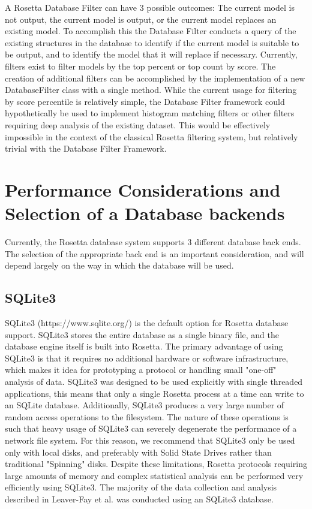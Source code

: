 A Rosetta Database Filter can have 3 possible outcomes:  The current model is not output, the current model is output, or the current model replaces an existing model.
To accomplish this the Database Filter conducts a query of the existing structures in the database  to identify if the current model is suitable to be output, and to identify the model that it will replace if necessary. 
Currently, filters exist to filter models by the top percent or top count by score.
The creation of additional filters can be accomplished by the implementation of a new DatabaseFilter class with a single method.
While the current usage for filtering by score percentile is relatively simple, the Database Filter framework could hypothetically be used to implement histogram matching filters or other filters requiring deep analysis of the existing dataset.
This would be effectively impossible in the context of the classical Rosetta filtering system, but relatively trivial with the Database Filter Framework.

\section{Performance Considerations and Selection of a Database backends}

Currently, the Rosetta database system supports 3 different database back ends.
The selection of the appropriate back end is an important consideration, and will depend largely on the way in which the database will be used.

\subsection{SQLite3}
SQLite3 (https://www.sqlite.org/) is the default option for Rosetta database support.
SQLite3 stores the entire database as a single binary file, and the database engine itself is built into Rosetta.
The primary advantage of using SQLite3 is that it requires no additional hardware or software infrastructure, which makes it idea for prototyping a protocol or handling small "one-off" analysis of data.
SQLite3 was designed to be used explicitly with single threaded applications, this means that only a single Rosetta process at a time can write to an SQLite database.
Additionally, SQLite3 produces a very large number of random access operations to the filesystem.
The nature of these operations is such that heavy usage of SQLite3 can severely degenerate the performance of a network file system.
For this reason, we recommend that SQLite3 only be used only with local disks, and preferably with Solid State Drives rather than traditional "Spinning" disks.
Despite these limitations, Rosetta protocols requiring large amounts of memory and complex statistical analysis can be performed very efficiently using SQLite3.
The majority of the data collection and analysis described in Leaver-Fay et al.\citep{LeaverFay:2013fn} was conducted using an SQLite3 database.

